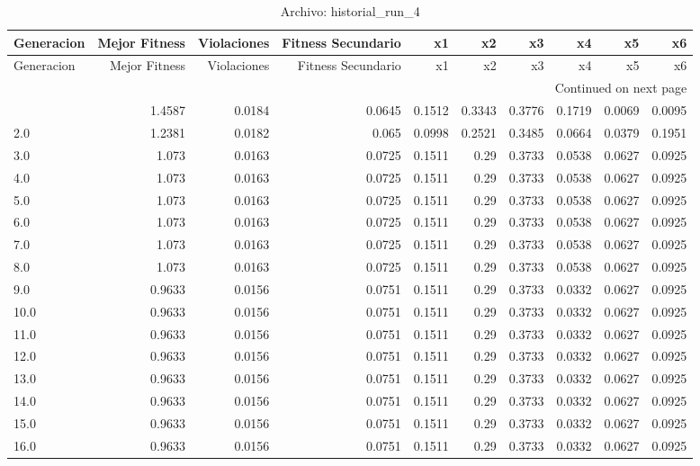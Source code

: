 \begin{longtable}{lrrrrrrrrr}
\caption{Archivo: historial\_run\_4}\label{tab:historial_run_4} \\
\toprule
Generacion & Mejor Fitness & Violaciones & Fitness Secundario & x1 & x2 & x3 & x4 & x5 & x6 \\
\midrule
\endfirsthead
\toprule
Generacion & Mejor Fitness & Violaciones & Fitness Secundario & x1 & x2 & x3 & x4 & x5 & x6 \\
\midrule
\endhead
\midrule
\multicolumn{10}{r}{Continued on next page} \\
\midrule
\endfoot
\bottomrule
\endlastfoot
1.0 & 1.4587 & 0.0184 & 0.0645 & 0.1512 & 0.3343 & 0.3776 & 0.1719 & 0.0069 & 0.0095 \\
2.0 & 1.2381 & 0.0182 & 0.065 & 0.0998 & 0.2521 & 0.3485 & 0.0664 & 0.0379 & 0.1951 \\
3.0 & 1.073 & 0.0163 & 0.0725 & 0.1511 & 0.29 & 0.3733 & 0.0538 & 0.0627 & 0.0925 \\
4.0 & 1.073 & 0.0163 & 0.0725 & 0.1511 & 0.29 & 0.3733 & 0.0538 & 0.0627 & 0.0925 \\
5.0 & 1.073 & 0.0163 & 0.0725 & 0.1511 & 0.29 & 0.3733 & 0.0538 & 0.0627 & 0.0925 \\
6.0 & 1.073 & 0.0163 & 0.0725 & 0.1511 & 0.29 & 0.3733 & 0.0538 & 0.0627 & 0.0925 \\
7.0 & 1.073 & 0.0163 & 0.0725 & 0.1511 & 0.29 & 0.3733 & 0.0538 & 0.0627 & 0.0925 \\
8.0 & 1.073 & 0.0163 & 0.0725 & 0.1511 & 0.29 & 0.3733 & 0.0538 & 0.0627 & 0.0925 \\
9.0 & 0.9633 & 0.0156 & 0.0751 & 0.1511 & 0.29 & 0.3733 & 0.0332 & 0.0627 & 0.0925 \\
10.0 & 0.9633 & 0.0156 & 0.0751 & 0.1511 & 0.29 & 0.3733 & 0.0332 & 0.0627 & 0.0925 \\
11.0 & 0.9633 & 0.0156 & 0.0751 & 0.1511 & 0.29 & 0.3733 & 0.0332 & 0.0627 & 0.0925 \\
12.0 & 0.9633 & 0.0156 & 0.0751 & 0.1511 & 0.29 & 0.3733 & 0.0332 & 0.0627 & 0.0925 \\
13.0 & 0.9633 & 0.0156 & 0.0751 & 0.1511 & 0.29 & 0.3733 & 0.0332 & 0.0627 & 0.0925 \\
14.0 & 0.9633 & 0.0156 & 0.0751 & 0.1511 & 0.29 & 0.3733 & 0.0332 & 0.0627 & 0.0925 \\
15.0 & 0.9633 & 0.0156 & 0.0751 & 0.1511 & 0.29 & 0.3733 & 0.0332 & 0.0627 & 0.0925 \\
16.0 & 0.9633 & 0.0156 & 0.0751 & 0.1511 & 0.29 & 0.3733 & 0.0332 & 0.0627 & 0.0925 \\

\end{longtable}
